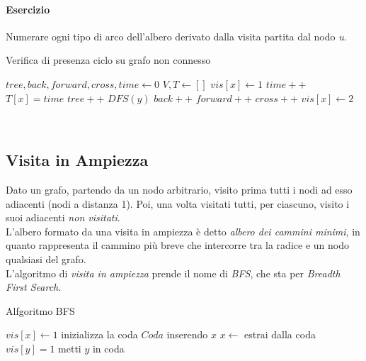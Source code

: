\paragraph{Esercizio}
Numerare ogni tipo di arco dell'albero derivato dalla visita partita dal nodo \textit{u}.\\
\begin{algorithm}
	\caption{Verifica di presenza ciclo su grafo non connesso}\label{alg:VPCnC}
	\begin{algorithmic}[1]
		\State $tree, back, forward, cross, time \gets 0$
		\State $V, T \gets []$ 
			\State $vis[x] \gets 1$
			\State $time++$
			\State $T[x] = time$
				\State $tree++$
					\State $DFS(y)$
				\Else
						\State $back++$
						\State $forward++$
					\Else
						\State $cross++$
					\EndIf
				\EndIf
			\EndFor
			\State $vis[x] \gets 2$
		\EndFunction
	\end{algorithmic}
\end{algorithm} \hfill \\
\newpage

\subsection{Visita in Ampiezza}
Dato un grafo, partendo da un nodo arbitrario, visito prima tutti i nodi ad esso adiacenti (nodi a distanza 1). Poi, una volta visitati tutti, per ciascuno, visito i suoi adiacenti \textit{non visitati}. \\
L'albero formato da una visita in ampiezza è detto \textit{albero dei cammini minimi}, in quanto rappresenta il cammino più breve che intercorre tra la radice e un nodo qualsiasi del grafo. \\
L'algoritmo di \textit{visita in ampiezza} prende il nome di \textit{BFS}, che sta per \textit{Breadth First Search}.
\begin{algorithm}
	\caption{Alfgoritmo BFS}\label{alg:BFS}
	\begin{algorithmic}[1]
			\State $vis[x] \gets 1$
			\State inizializza la coda $Coda$ inserendo $x$
				\State $x \gets $ estrai dalla coda
						\State $vis[y] = 1$
						\State metti $y$ in coda
					\EndIf
				\EndFor
			\EndWhile
		\EndFunction
	\end{algorithmic}
\end{algorithm} \hfill \\

